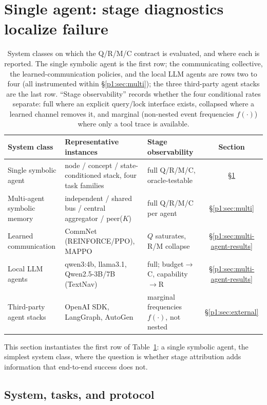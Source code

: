 \documentclass{article}
\begin{document}
\section{Single agent: stage diagnostics localize failure}
\label{p1:sec:single}

\begin{table}[t]
  \caption{System classes on which the Q/R/M/C contract is evaluated, and where each is reported. The single symbolic agent is the first row; the communicating collective, the learned-communication policies, and the local LLM agents are rows two to four (all instrumented within \S\ref{p1:sec:multi}); the three third-party agent stacks are the last row. ``Stage observability'' records whether the four conditional rates separate: full where an explicit query/lock interface exists, collapsed where a learned channel removes it, and marginal (non-nested event frequencies $f(\cdot)$) where only a tool trace is available.}
  \label{p1:tab:portability}
  \centering
  \small
  \begin{tabular}{p{3.5cm} p{4.6cm} p{3.5cm} c}
    \toprule
    System class & Representative instances & Stage observability & Section \\
    \midrule
    Single symbolic agent & node / concept / state-conditioned stack, four task families & full Q/R/M/C, oracle-testable & \S\ref{p1:sec:single} \\
    Multi-agent symbolic memory & independent / shared bus / central aggregator / peer($K$) & full Q/R/M/C per agent & \S\ref{p1:sec:multi} \\
    Learned communication & CommNet (REINFORCE/PPO), MAPPO & $Q$ saturates, R/M collapse & \S\ref{p1:sec:multi-agent-results} \\
    Local LLM agents & qwen3:4b, llama3.1, Qwen2.5-3B/7B (TextNav) & full; budget$\to$C, capability$\to$R & \S\ref{p1:sec:multi-agent-results} \\
    Third-party agent stacks & OpenAI SDK, LangGraph, AutoGen & marginal frequencies $f(\cdot)$, not nested & \S\ref{p1:sec:external} \\
    \bottomrule
  \end{tabular}
\end{table}

This section instantiates the first row of
Table~\ref{p1:tab:portability}: a single symbolic agent, the simplest
system class, where the question is whether stage attribution adds
information that end-to-end success does not.

\subsection{System, tasks, and protocol}
\label{p1:sec:single-setup}
\end{document}
